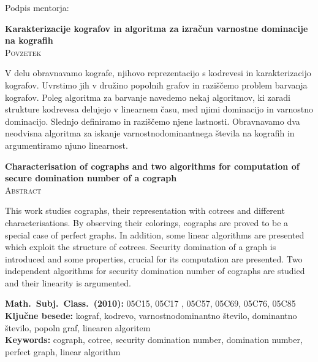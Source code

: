 \documentclass[12pt,a4paper,twoside]{article}
\newcommand{\naslovdela}{Karakterizacije kografov in algoritma za izračun varnostne dominacije na kografih}
\newcommand{\kljucnebesede}{kograf\sep kodrevo\sep varnostnodominantno število\sep dominantno število\sep popoln graf\sep linearen algoritem} %
\newcommand{\keywords}{cograph\sep cotree\sep security domination number\sep domination number\sep perfect graph\sep linear algorithm} %
\newcommand{\sep}{, }  %
\theoremstyle{definition} %
\theoremstyle{plain} %
\numberwithin{equation}{section}  %
\begin{document}
\vspace{2cm}
\hspace*{\fill} Podpis mentorja: \phantom{prostor za podpis}


\cleardoublepage
{}

\begin{center}
\textbf{\naslovdela} \\[3mm]
\textsc{Povzetek} \\[2mm]
\end{center}
V delu obravnavamo kografe, njihovo reprezentacijo s kodrevesi in karakterizacijo kografov. Uvrstimo jih v družino popolnih grafov in raziščemo problem barvanja kografov. Poleg algoritma za barvanje navedemo nekaj algoritmov, ki zaradi strukture kodrevesa delujejo v linearnem času, med njimi dominacijo in varnostno dominacijo. Slednjo definiramo in raziščemo njene lastnosti. Obravnavamo dva neodvisna algoritma za iskanje varnostnodominantnega števila na kografih in argumentiramo njuno linearnost.

\vfill
\begin{center}
\textbf{Characterisation of cographs and two algorithms for computation of secure domination number of a cograph} \\[3mm] %
\textsc{Abstract}\\[2mm]
\end{center}
This work studies cographs, their representation with cotrees and different characterisations. By observing their colorings, cographs are proved to be a special case of perfect graphs. In addition, some linear algorithms are presented which exploit the structure of cotrees. Security domination of a graph is introduced and some properties, crucial for its computation are presented. Two independent algorithms for security domination number of cographs are studied and their linearity is argumented.

\vfill\noindent
\textbf{Math.~Subj.~Class.~(2010):} 05C15, 05C17 , 05C57, 05C69, 05C76, 05C85 \\[1mm]
\textbf{Ključne besede:} \kljucnebesede \\[1mm]
\textbf{Keywords:} \keywords

\cleardoublepage

\setcounter{page}{1}    %
\end{document}
